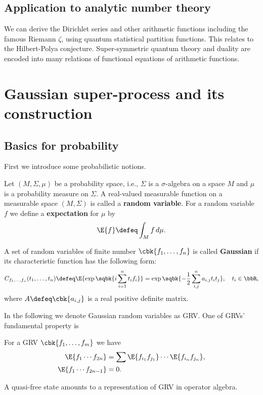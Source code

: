 \documentclass[openany, a4paper, oneside]{jsbook}
\begin{document}
\subsection{Application to analytic number theory \cite{AsaoArai17}}

We can derive the Dirichlet series and other arithmetic functions including the famous Riemann $\zeta$,
using quantum statistical partition functions.
This relates to the Hilbert-Polya conjecture.
Super-symmetric quantum theory and duality are encoded into many relations of functional equations of arithmetic functions.
\section{Gaussian super-process and its construction}

\subsection{Basics for probability}

First we introduce some probabilistic notions.

Let $(M, \Sigma, \mu)$ be a probability space, i.e.,
$\Sigma$ is a $\sigma$-algebra on a space $M$ and $\mu$ is a probability measure on $\Sigma$.
A real-valued measurable function on a measurable space $(M, \Sigma)$ is called a \textbf{random variable}.
For a random variable $f$ we define a \textbf{expectation} for $\mu$ by
\begin{align}
 \E{f} \defeq \int_M f \, d \mu.
\end{align}

A set of random variables of finite number $\cbk{f_1, \dots, f_n}$ is called \textbf{Gaussian}
if its characteristic function has the following form:
\begin{align}
 C_{f_1, \dots, f_n} (t_1, \dots, t_n)
 \defeq
 \E{\exp \sqbk{i \sum_{i=1}^n t_i f_i}}
 =
 \exp \sqbk{- \frac{1}{2} \sum_{i,j}^{n} a_{i,j} t_i t_j}, \quad t_i \in \bbR,
\end{align}
where $A \defeq \cbk{a_{i,j}}$ is a real positive definite matrix.

In the following we denote Gaussian random variables as GRV.
One of GRVs' fundamental property is
\begin{prop}
 For a GRV $\cbk{f_1, \dots, f_m}$ we have
 \begin{align}
  \E{f_1 \cdots f_{2n}}
  &=
  \sum \E{f_{i_1} f_{j_1}}  \cdots \E{f_{i_n} f_{j_n}}, \\
  \E{f_1 \cdots f_{2n-1}}
  &= 0.
 \end{align}
\end{prop}
\begin{rem}
 A quasi-free state amounts to a representation of GRV in operator algebra.
\end{rem}
\end{document}
